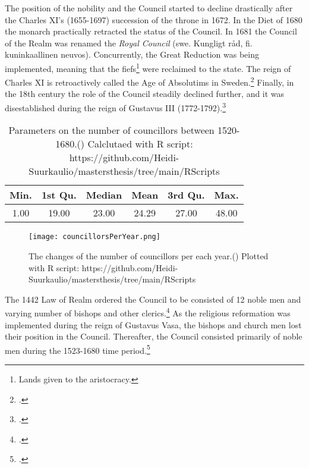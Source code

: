 The position of the nobility and the Council started to decline drastically after the Charles XI's (1655-1697) succession of the throne in 1672. In the Diet of 1680 the monarch practically retracted the status of the Council. In 1681 the Council of the Realm was renamed the \textit{Royal Council} (swe. Kungligt råd, fi. kuninkaallinen neuvos). Concurrently, the Great Reduction was being implemented, meaning that the fiefs\footnote{Lands given to the aristocracy.} were reclaimed to the state. The reign of Charles XI is retroactively called the Age of Absolutims in Sweden.\footcites[pp. 289-295,]{pSuurvalta}[pp. 8-9.]{personalAgency} Finally, in the 18th century the role of the Council steadily declined further, and it was disestablished during the reign of Gustavus III (1772-1792).\footcite[p. 14.]{hopesAndFearsIntro}

\begin{table}
	\caption[Parameters on the number of councillors between 1520-1680]{Parameters on the number of councillors between 1520-1680.(\cite{councillorsDS}) Calclutaed with R script: https://github.com/Heidi-Suurkaulio/mastersthesis/tree/main/RScripts}
	\label{tab:councillors}
	\centering
\begin{tabular}{c c c c c c}
	\hline
	Min. & 1st Qu. & Median & Mean & 3rd Qu. & Max.\\
	\hline
	1.00 & 19.00 & 23.00 & 24.29 & 27.00 & 48.00\\
	\hline
\end{tabular}
\end{table}

\begin{figure}[h]
	\texttt{[image: councillorsPerYear.png]}
	\centering
	\caption[The changes of the number of councillors per each year 1520-1680]{The changes of the number of councillors per each year.(\cite{councillorsDS}) Plotted with R script: https://github.com/Heidi-Suurkaulio/mastersthesis/tree/main/RScripts} 
	\centering
	\label{fig:peryear}
\end{figure}

The 1442 Law of Realm ordered the Council to be consisted of 12 noble men and varying number of bishops and other clerics.\footcite[p. 49.]{HakanenAKoskinen2017} As the religious reformation was implemented during the reign of Gustavus Vasa, the bishops and church men lost their position in the Council. Thereafter, the Council consisted primarily of noble men during the 1523-1680 time period.\footcites[pp. 72-75,]{pSuurvalta}[p. 15]{agencyAndStateBuilding} 


